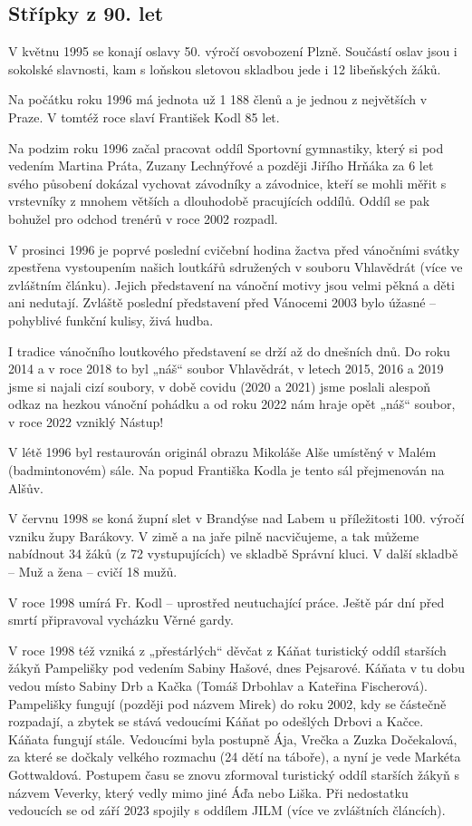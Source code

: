\subsection{Střípky z 90. let}\label{stux159uxedpky-z-90.-let}

V květnu 1995 se konají oslavy 50. výročí osvobození Plzně. Součástí
oslav jsou i sokolské slavnosti, kam s loňskou sletovou skladbou jede i
12 libeňských žáků.

Na počátku roku 1996 má jednota už 1 188 členů a je jednou z největších
v Praze. V tomtéž roce slaví František Kodl 85 let.

Na podzim roku 1996 začal pracovat oddíl Sportovní gymnastiky, který si
pod vedením Martina Práta, Zuzany Lechnýřové a později Jiřího Hrňáka za
6 let svého působení dokázal vychovat závodníky a závodnice, kteří se
mohli měřit s vrstevníky z mnohem větších a dlouhodobě pracujících
oddílů. Oddíl se pak bohužel pro odchod trenérů v roce 2002 rozpadl.

V prosinci 1996 je poprvé poslední cvičební hodina žactva před vánočními
svátky zpestřena vystoupením našich loutkářů sdružených v souboru
Vhlavědrát (více ve zvláštním článku). Jejich představení na vánoční
motivy jsou velmi pěkná a děti ani nedutají. Zvláště poslední
představení před Vánocemi 2003 bylo úžasné -- pohyblivé funkční kulisy,
živá hudba.

I tradice vánočního loutkového představení se drží až do dnešních dnů.
Do roku 2014 a v roce 2018 to byl „náš`` soubor Vhlavědrát, v letech
2015, 2016 a 2019 jsme si najali cizí soubory, v době covidu (2020 a
2021) jsme poslali alespoň odkaz na hezkou vánoční pohádku a od roku
2022 nám hraje opět „náš`` soubor, v roce 2022 vzniklý Nástup!

V létě 1996 byl restaurován originál obrazu Mikoláše Alše umístěný v
Malém (badmintonovém) sále. Na popud Františka Kodla je tento sál
přejmenován na Alšův.

V červnu 1998 se koná župní slet v Brandýse nad Labem u příležitosti
100. výročí vzniku župy Barákovy. V zimě a na jaře pilně nacvičujeme, a
tak můžeme nabídnout 34 žáků (z 72 vystupujících) ve skladbě Správní
kluci. V další skladbě -- Muž a žena -- cvičí 18 mužů.

V roce 1998 umírá Fr. Kodl -- uprostřed neutuchající práce. Ještě pár
dní před smrtí připravoval vycházku Věrné gardy.

V roce 1998 též vzniká z „přestárlých`` děvčat z Káňat turistický oddíl
starších žákyň Pampelišky pod vedením Sabiny Hašové, dnes Pejsarové.
Káňata v tu dobu vedou místo Sabiny Drb a Kačka (Tomáš Drbohlav a
Kateřina Fischerová). Pampelišky fungují (později pod názvem Mirek) do
roku 2002, kdy se částečně rozpadají, a zbytek se stává vedoucími Káňat
po odešlých Drbovi a Kačce. Káňata fungují stále. Vedoucími byla
postupně Ája, Vrečka a Zuzka Dočekalová, za které se dočkaly velkého
rozmachu (24 dětí na táboře), a nyní je vede Markéta Gottwaldová.
Postupem času se znovu zformoval turistický oddíl starších žákyň s
názvem Veverky, který vedly mimo jiné Áďa nebo Liška. Při nedostatku
vedoucích se od září 2023 spojily s oddílem JILM (více ve zvláštních
článcích).

